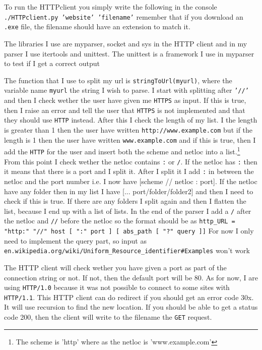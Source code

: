 \documentclass{sig-alternate-05-2015}
\begin{document}
To run the HTTPclient you simply write the following in the console \texttt{./HTTPclient.py 'website' 'filename'} remember that if you download an \texttt{.exe} file, the filename should have an extension to match it.

The libraries I use are myparser, socket and sys in the HTTP client and in my parser I use itertools and unittest. The unittest is a framework I use in myparser to test if I get a correct output

The function that I use to split my url is \texttt{stringToUrl(myurl)}, where the variable name \texttt{myurl} the string I wish to parse.
I start with splitting after \texttt{'//'} and then I check wether the user have given me \texttt{HTTPS} as input. If this is true, then I raise an error and tell the user that \texttt{HTTPS} is not implemented and that they should use \texttt{HTTP} instead.
After this I check the length of my list. I the length is greater than 1 then the user have written \texttt{http://www.example.com} but if the length is 1 then the user have written \texttt{www.example.com} and if this is true, then I add the \texttt{HTTP} for the user and insert both the scheme and netloc into a list.\footnote{The scheme is 'http' where as the netloc is 'www.example.com'}
From this point I check wether the netloc contains \texttt{:} or \texttt{/}. If the netloc has \texttt{:} then it means that there is a port and I split it. After I split it I add \texttt{:} in between the netloc and the port number i.e. I now have [scheme // netloc : port]. If the netloc have any folder then in my list I have [... port/folder/folder2] and then I need to check if this is true. If there are any folders I split again and then I flatten the list, because I end up with a list of lists. In the end of the parser I add a \texttt{/} after the netloc and \texttt{//} before the netloc so the format should be as \texttt{http\_URL = "http:" "//" host [ ":" port ] [ abs\_path [ "?" query ]]}
For now I only need to implement the query part, so input as \-\texttt{en.wikipedia.org/wiki/Uniform\_Resource\_identifier\#Examples} won't work

The HTTP client will check wether you have given a port as part of the connection string or not. If not, then the default port will be 80.
As for now, I are using \texttt{HTTP/1.0} because it was not possible to connect to some sites with \texttt{HTTP/1.1}.
This HTTP client can do redirect if you should get an error code 30x. It will use recursion to find the new location.
If you should be able to get a status code 200, then the client will write to the filename the \texttt{GET} request.
\end{document}
